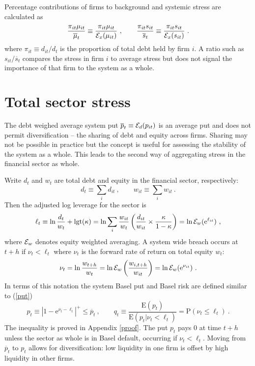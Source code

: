 \documentclass[authoryear]{elsarticle}
\newcommand{\logit}{\mathrm{lgt}}
\newcommand{\E}{\mathrm{E}}
\newcommand{\p}{\mathrm{P}}
\newcommand{\e}{\mathrm{e}}
\newcommand{\Ex}{{\cal E}}
\newcommand{\eref}[1]{(\ref{#1})}
\newcommand{\aref}[1]{Appendix \ref{#1}}
\newcommand{\cq}{\ , \qquad}
\newcommand{\be}[1]{\begin{equation}\label{#1}}
\newcommand{\ee}{\end{equation}}
\begin{document}
Percentage contributions of firms to background and systemic stress are calculated as
$$
\frac{\pi_{it}\mu_{it}}{\overline \mu_t} \equiv \frac{\pi_{it}\mu_{it}}{\Ex_x(\mu_{it})}\cq \frac{\pi_{it}s_{it}}{\overline s_t} \equiv \frac{\pi_{it}s_{it}}{\Ex_x(s_{it})}\ .
$$
where $\pi_{it}\equiv d_{it}/d_t$ is the proportion of total debt held by firm $i$.   A ratio such as $s_{it}/\overline s_t$ compares the stress in firm $i$ to average stress but does not signal the importance of that firm to the system as a whole.  


\section{Total sector stress}

The debt weighed average system  put $\overline p_t\equiv\Ex_d(p_{it})$ is an average put and does not permit  diversification -- the  sharing of debt and equity across firms.   Sharing may not be possible in practice but the concept is useful for assessing the stability of the system as a whole.   This leads to the second way of aggregating stress in the financial sector as whole.

Write  $d_t$ and $w_t$ are total debt and equity in the financial sector, respectively:
$$
d_t \equiv \sum_i d_{it}\cq w_{it} \equiv \sum_i w_{it}\ .
$$
Then the   adjusted log leverage for the sector is  
$$
\ell_t \equiv  \ln \frac{d_t}{w_t} +\logit(\kappa) =  \ln \sum_i\frac{w_{it}}{w_t}\left(\frac{ d_{it}}{ w_{it}}\times \frac{\kappa}{1-\kappa}\right) = \ln \Ex_w(\e^{\ell_{it}}) \ ,
$$
where $\Ex_w$ denotes equity weighted averaging.  A system wide breach occurs at $t+h$ if
$
\nu_t < \ell_t
$
where $\nu_t$ is the forward rate of return on total equity $w_t$:
\be{ew}
 \nu_t =  \ln \frac{w_{t+h}}{w_t} = \ln\Ex_w\left(\frac{w_{i,t+h}}{w_{it}}\right) = \ln \Ex_w(\e^{\nu_{it}})\ . 
\ee
In terms of this notation the system Basel put  and Basel risk are defined similar to \eref{put}
$$
p_t\equiv |1-\e^{\nu_t-\ell_t}|^+\le \overline p_t\cq q_t\equiv \frac{\E(p_t)}{\E(p_{t}|\nu_t<\ell_t)}=\p(\nu_t\le \ell_t) \ .
$$
The inequality is proved in  \aref{proof}.  The  put $p_t$ pays 0 at time $t+h$ unless the sector as whole is in Basel default, occurring if $\nu_t  <  \ell_t$. Moving from $\overline p_t$ to $p_t$  allows for diversification:   low liquidity  in one firm is offset by high liquidity  in other  firms.  
\end{document}
